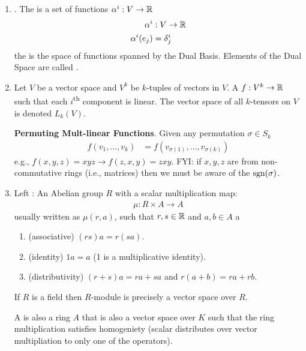 \documentclass[10pt,a4paper]{report}
\begin{document}
\begin{enumerate}
\begin{itemize}
	\end{itemize}
	\item {}.  The  is a set of functions $\alpha^i: V \to \mathbb{R}$ 
	\begin{align*}
		\alpha^i &: V \to \mathbb{R} \\
			\alpha^i(e_j) &= \delta_j^i
	\end{align*}the  is the space of functions spanned by the Dual Basis. Elements of the Dual Space are called .  
	\item {} Let $V$ be a vector space and $V^k$ be $k$-tuples of vectors in $V$. A  $f: V^k \to \mathbb{R}$ such that each $i$\textsuperscript{th} component is linear.  The vector space of all $k$-tensors on $V$ is denoted $L_k(V)$.
	
	\textbf{Permuting Mult-linear Functions}.  Given any permutation $\sigma \in S_k$
	\begin{align*}
		f(v_1, \dots, v_k) &= f(v_{\sigma(1)}, \dots, v_{\sigma(k)})
	\end{align*}e.g., $f(x,y,z) = xyz \to f(z,x,y) = zxy$.  FYI: if $x,y,z$ are from non-commutative rings (i.e., matrices) then we must be aware of the $\operatorname{sgn}(\sigma)$.
	
	\item Left : An Abelian group $R$ with a scalar multiplication map:
	\begin{align*}
		\mu : R \times A \to A
	\end{align*}usually written as $\mu(r,a)$, such that $r,s \in \mathbb{R}$ and $a,b \in A$	 a
	\begin{enumerate}[label=(\roman*)]
		\item (associative) $(rs)a = r(sa)$.
		\item (identity) $1a = a$ (1 is a multiplicative identity).
		\item (distributivity) $(r+s)a = ra+sa$ and $r(a+b) = ra+rb$.	
	\end{enumerate}	 If $R$ is a field then $R$-module is precisely a vector space over $R$.
	
	A  is also a ring $A$ that is also a vector space over $K$ such that the ring multiplication satisfies homogeniety (scalar distributes over vector multipliation to only one of the operators).
	

\end{enumerate}
\end{document}
